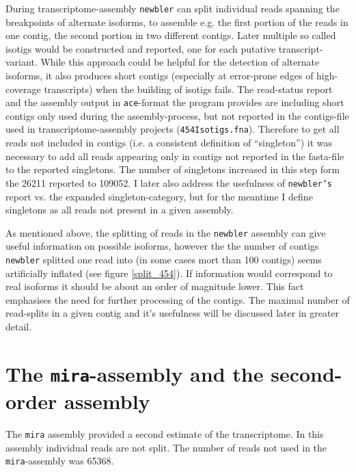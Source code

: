 During transcriptome-assembly \texttt{newbler} can split individual
reads spanning the breakpoints of alternate isoforms, to assemble
e.g. the first portion of the reads in one contig, the second portion
in two different contigs. Later multiple so called isotigs would be
constructed and reported, one for each putative
transcript-variant. While this approach could be helpful for the
detection of alternate isoforms, it also produces short contigs
(especially at error-prone edges of high-coverage transcripts) when
the building of isotigs fails. The read-status report and the assembly
output in \texttt{ace}-format the program provides are including short
contigs only used during the assembly-process, but not reported in the
contigs-file used in transcriptome-assembly projects
(\texttt{454Isotigs.fna}). Therefore to get all reads not included in
contigs (i.e. a consistent definition of ``singleton'') it was
necessary to add all reads appearing only in contigs not reported in
the fasta-file to the reported singletons. The number of singletons
increased in this step form the 26211 reported to 109052. I later
also address the usefulness of \texttt{newbler's} report vs. the
expanded singleton-category, but for the meantime I define singletons
as all reads not present in a given assembly.


As mentioned above, the splitting of reads in the \texttt{newbler}
assembly can give useful information on possible isoforms, however the
the number of contigs \texttt{newbler} splitted one read into (in some
cases mort than 100 contigs) seems artificially inflated (see figure
\ref{split_454}). If information would correspond to real isoforms it
should be about an order of magnitude lower. This fact emphasises the
need for further processing of the contigs. The maximal number of
read-splits in a given contig and it's usefulness will be discussed
later in greater detail.

\section{The \texttt{mira}-assembly and the second-order assembly}
\label{sec:assembly-sec}

The \texttt{mira} assembly provided a second estimate of the
transcriptome. In this assembly individual reads are not split. The
number of reads not used in the \texttt{mira}-assembly was 65368.

